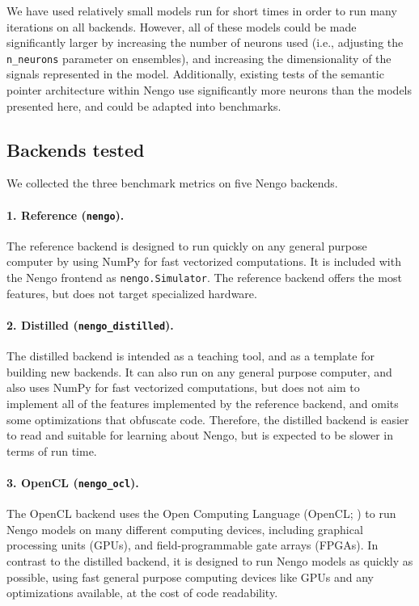 \documentclass{frontiersSCNS}
\begin{document}
We have used relatively small
models run for short times in order
to run many iterations on all backends.
However, all of these models
could be made significantly larger
by increasing the number of neurons used
(i.e., adjusting the \texttt{n\_neurons}
parameter on ensembles),
and increasing the dimensionality
of the signals represented in the model.
Additionally, existing tests
of the semantic pointer architecture
within Nengo use significantly more neurons
than the models presented here,
and could be adapted into benchmarks.

\subsection{Backends tested}

We collected the three benchmark metrics
on five Nengo backends.

\paragraph{1. Reference (\texttt{nengo}).}
The reference backend is designed to run quickly
on any general purpose computer
by using NumPy \citep{vanderwalt2011}
for fast vectorized computations.
It is included with the Nengo frontend
as \texttt{nengo.Simulator}.
The reference backend offers
the most features, but does not target
specialized hardware.

\paragraph{2. Distilled (\texttt{nengo\_distilled}).}
The distilled backend is intended as a teaching tool,
and as a template for building new backends.
It can also run on any general purpose computer,
and also uses NumPy for fast vectorized computations,
but does not aim to implement all of the features
implemented by the reference backend,
and omits some optimizations that obfuscate code.
Therefore, the distilled backend is easier to read
and suitable for learning about Nengo,
but is expected to be slower in terms of run time.

\paragraph{3. OpenCL (\texttt{nengo\_ocl}).}
The OpenCL backend uses the Open Computing Language
(OpenCL; \citealp{stone2010})
to run Nengo models on many different computing devices,
including graphical processing units (GPUs),
and field-programmable gate arrays (FPGAs).
In contrast to the distilled backend,
it is designed to run Nengo models
as quickly as possible,
using fast general purpose computing devices
like GPUs and any optimizations available,
at the cost of code readability.
\end{document}
